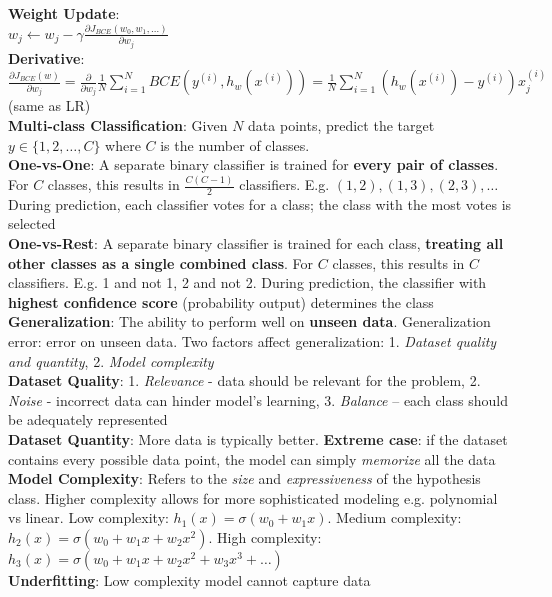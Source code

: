 \documentclass{article}
\begin{document}
\begin{multicols*}{3}
\textbf{Weight Update}:\\ $w_j \leftarrow w_j-\gamma\frac{\partial J_{BCE}(w_0, w_1,\dots)}{\partial w_j}$\\
\textbf{Derivative}: \\ $
    \frac{\partial J_{BCE}(w)}{\partial w_j}=\frac{\partial}{\partial w_j}\frac{1}{N}\sum^N_{i=1}BCE(y^{(i)}, h_w(x^{(i)})) 
    =\frac{1}{N}\sum^N_{i=1}(h_w(x^{(i)})-y^{(i)})x_j^{(i)}
$ (same as LR) \\
\textbf{Multi-class Classification}: Given $N$ data points, predict the target $y\in\{1,2,\dots,C\}$ where $C$ is the number of classes. \\
\textbf{One-vs-One}: A separate binary classifier is trained for \textbf{every pair of classes}. For $C$ classes, this results in $\frac{C(C-1)}{2}$ classifiers. E.g. $(1, 2), (1,3), (2,3),\dots$ During prediction, each classifier votes for a class; the class with the most votes is selected \\
\textbf{One-vs-Rest}: A separate binary classifier is trained for each class, \textbf{treating all other classes as a single combined class}. For $C$ classes, this results in $C$ classifiers. E.g. 1 and not 1, 2 and not 2. During prediction, the classifier with \textbf{highest confidence score} (probability output) determines the class \\
\textbf{Generalization}: The ability to perform well on \textbf{unseen data}. Generalization error: error on unseen data. Two factors affect generalization: 1. \textit{Dataset quality and quantity}, 2. \textit{Model complexity} \\
\textbf{Dataset Quality}: 1. \textit{Relevance} - data should be relevant for the problem, 2. \textit{Noise} - incorrect data can hinder model's learning, 3. \textit{Balance} – each class should be adequately represented \\
\textbf{Dataset Quantity}: More data is typically better. \textbf{Extreme case}: if the dataset contains every possible data point, the model can simply \textit{memorize} all the data \\
\textbf{Model Complexity}: Refers to the \textit{size} and \textit{expressiveness} of the hypothesis class. Higher complexity allows for more sophisticated modeling e.g. polynomial vs linear. Low complexity: $h_1(x)=\sigma(w_0+w_1x)$. Medium complexity: $h_2(x)=\sigma(w_0+w_1x+w_2x^2)$. High complexity: $h_3(x)=\sigma(w_0+w_1x+w_2x^2+w_3x^3+\dots)$ \\
\textbf{Underfitting}: Low complexity model cannot capture data\\

\end{multicols*}
\end{document}

